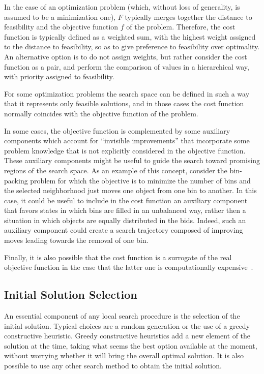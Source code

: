 In the case of an optimization problem (which, without loss of
generality, is assumed to be a minimization one), $F$ typically merges
together the distance to feasibility and the objective function $f$ of
the problem.  Therefore, the cost function is typically defined as a
weighted sum, with the highest weight assigned to the distance to
feasibility, so as to give preference to feasibility over
optimality. %
%
An alternative option is to do not assign weights, but rather consider
the cost function as a pair, and perform the comparison of values in a
hierarchical way, with priority assigned to feasibility.

For some optimization problems the search space can be defined in such
a way that it represents only feasible solutions, and in those cases the cost
function normally coincides with the objective function of the problem.

In some cases, the objective function is complemented by some
auxiliary components which account for ``invisible improvements'' that
incorporate some problem knowledge that is not explicitly considered
in the objective function.  These auxiliary components might be useful
to guide the search toward promising regions of the search space.
As an example of this concept, consider the bin-packing problem for
which the objective is to minimize the number of bins and the selected
neighborhood just moves one object from one bin to another. In this
case, it could be useful to include in the cost function an auxiliary
component that favors states in which bins are filled in an unbalanced
way, rather then a situation in which objects are equally distributed
in the bids. Indeed, such an auxiliary component could create a search
trajectory composed of improving moves leading towards the removal of
one bin. %

Finally, it is also possible that the cost function is a surrogate of
the real objective function in the case that the latter one is
computationally expensive~\cite{KoCL11}.

\subsection{Initial Solution Selection}

An essential component of any local search procedure is the selection of
the initial solution. Typical choices are a random
generation or the use of a greedy constructive heuristic. 
Greedy constructive heuristics add a new element of the solution at the time, taking what seems the best option available at the moment, without worrying whether it will bring the overall optimal solution. It is also possible to use any
other search method to obtain the initial solution.

